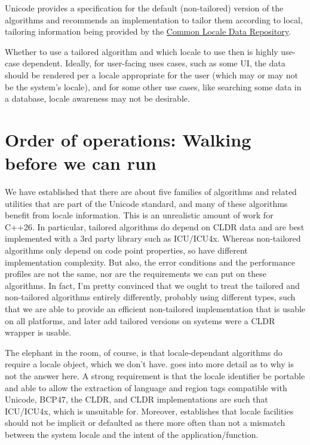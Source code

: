\documentclass{wg21}
\begin{document}
Unicode provides a specification for the default (non-tailored) version of the algorithms and recommends an implementation to tailor them according to local, tailoring information being provided by the \href{https://cldr.Unicode.org/}{Common Locale Data Repository}.

Whether to use a tailored algorithm and which locale to use then is highly use-case dependent. Ideally, for user-facing uses cases, such as some UI,
the data should be rendered per a locale appropriate for the user (which may or may not be the system's locale), and for some other use cases, like searching some data in
a database, locale awareness may not be desirable.

\section{Order of operations: Walking before we can run}

We have established that there are about five families of algorithms and related utilities that are part of the Unicode standard, and many of these algorithms benefit from locale information. This is an unrealistic amount of work for C++26. In particular, tailored algorithms do depend on CLDR data and are best implemented with a 3rd party library
such as ICU/ICU4x.
Whereas non-tailored algorithms only depend on code point properties, so have different implementation complexity. But also, the error conditions and the performance profiles are not the same, nor are the requirements we can put on these algorithms.
In fact, I'm pretty convinced that we ought to treat the tailored and non-tailored algorithms entirely differently, probably using different types, such that we are able to provide an efficient non-tailored implementation that is usable on all platforms, and later add tailored versions on systems were a CLDR wrapper is usable.

The elephant in the room, of course, is that locale-dependant algorithms do require a locale object, which we don't have.
 goes into more detail as to why  is not the answer here.
A strong requirement is that the locale identifier be portable and able to allow the extraction of language and region tags compatible with Unicode, BCP47, the CLDR, and CLDR implementations are such that ICU/ICU4x, which  is unsuitable for.
Moreover,  establishes that locale facilities should not be implicit or defaulted as there more often than not a mismatch between the system locale and the intent of the application/function.
\end{document}
